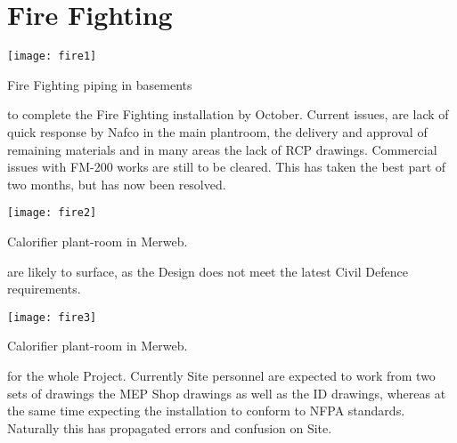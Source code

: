 
\chapter{Fire Fighting}
\begin{marginfigure}
  \texttt{[image: fire1]}
  \caption{Fire Fighting piping in basements}
  \label{fig:marginfig1}
\end{marginfigure}

 to complete the Fire Fighting installation by October. Current issues, are lack of quick response by Nafco in the main plantroom, the delivery and approval of remaining materials and in many areas the lack of RCP drawings. Commercial issues with FM-200 works are still to be cleared. This has taken the best part of two months, but has now been resolved.

\begin{marginfigure}
  \texttt{[image: fire2]}
  \caption{Calorifier plant-room in Merweb.}
  \label{fig:marginfig1}
\end{marginfigure}
 are likely to surface, as the Design does not meet the latest Civil Defence requirements. 
\begin{marginfigure}
  \texttt{[image: fire3]}
  \caption{Calorifier plant-room in Merweb.}
  \label{fig:marginfig1}
\end{marginfigure}

 for the whole Project. Currently Site personnel are expected to work from two sets of drawings the MEP Shop drawings as well as the ID drawings, whereas at the same time expecting the installation to conform to NFPA standards. Naturally this has propagated errors and confusion on Site.  

